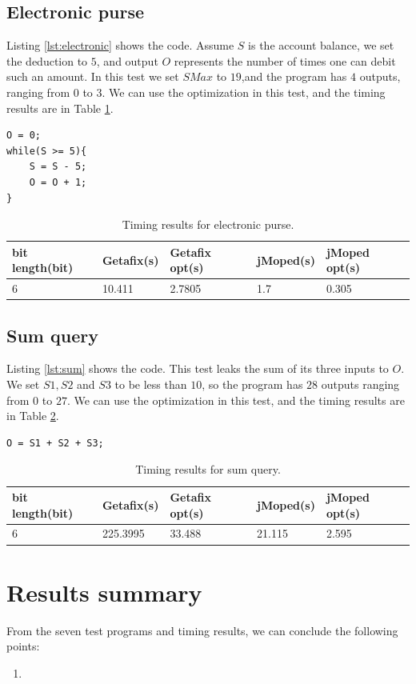 \subsection{Electronic purse}
Listing \ref{lst:electronic} shows the code. Assume $S$ is the account balance, we set the deduction to $5$, and output $O$ represents the number of times one can debit such an amount.  In this test we set $SMax$ to $19$,and the program has $4$ outputs, ranging from $0$ to $3$. We can use the optimization in this test, and the timing results are in Table \ref{tbl:electronic}.

\lstset{language=C}  
\begin{lstlisting}[float=h, caption={Electronic purse test program.},label=lst:electronic]
O = 0;
while(S >= 5){
	S = S - 5;
	O = O + 1;
}
\end{lstlisting}

\begin{table}[htbp]
\begin{tabular}{|l|l|l|l|l|}
\hline
{bit length(bit)} & Getafix(s) & {Getafix opt(s)} & jMoped(s) & {jMoped opt(s)} \\ \hline
{6} & {10.411} & {2.7805} & {1.7} & {0.305} \\ \hline
\end{tabular}
\caption{Timing results for electronic purse.}
\label{tbl:electronic}
\end{table}

\subsection{Sum query}
Listing \ref{lst:sum} shows the code. This test leaks the sum of its three inputs to $O$. We set $S1, S2$ and $S3$ to be less than $10$, so the program has $28$ outputs ranging from $0$ to $27$. We can use the optimization in this test, and the timing results are in Table \ref{tbl:sum}.

\lstset{language=C}  
\begin{lstlisting}[float=h, caption={Sum query test program.},label=lst:sum]
O = S1 + S2 + S3;
\end{lstlisting}

\begin{table}[htbp]
\begin{tabular}{|l|l|l|l|l|}
\hline
{bit length(bit)} & Getafix(s) & {Getafix opt(s)} & jMoped(s) & {jMoped opt(s)} \\ \hline
6 & 225.3995 & 33.488 & 21.115 & 2.595	\\ \hline
\end{tabular}
\caption{Timing results for sum query.}
\label{tbl:sum}
\end{table}

\section{Results summary}
From the seven test programs and timing results, we can conclude the following points:
\begin{enumerate}
\item 
\end{enumerate}


